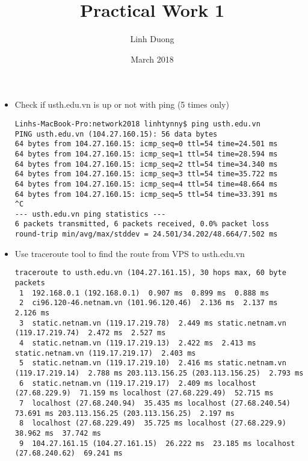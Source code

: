 \documentclass{article}
\title{Practical Work 1}
\author{Linh Duong}
\date{March 2018}
\begin{document}
\maketitle

\bigskip

\begin{itemize}
    \item Check if usth.edu.vn is up or not with ping (5 times only)
    
\begin{verbatim}
Linhs-MacBook-Pro:network2018 linhtynny$ ping usth.edu.vn
PING usth.edu.vn (104.27.160.15): 56 data bytes
64 bytes from 104.27.160.15: icmp_seq=0 ttl=54 time=24.501 ms
64 bytes from 104.27.160.15: icmp_seq=1 ttl=54 time=28.594 ms
64 bytes from 104.27.160.15: icmp_seq=2 ttl=54 time=34.340 ms
64 bytes from 104.27.160.15: icmp_seq=3 ttl=54 time=35.722 ms
64 bytes from 104.27.160.15: icmp_seq=4 ttl=54 time=48.664 ms
64 bytes from 104.27.160.15: icmp_seq=5 ttl=54 time=33.391 ms
^C
--- usth.edu.vn ping statistics ---
6 packets transmitted, 6 packets received, 0.0% packet loss
round-trip min/avg/max/stddev = 24.501/34.202/48.664/7.502 ms
\end{verbatim}

\bigskip


 \item Use traceroute tool to find the route from VPS to usth.edu.vn
 
\begin{verbatim}
traceroute to usth.edu.vn (104.27.161.15), 30 hops max, 60 byte packets
 1  192.168.0.1 (192.168.0.1)  0.907 ms  0.899 ms  0.888 ms
 2  ci96.120-46.netnam.vn (101.96.120.46)  2.136 ms  2.137 ms  2.126 ms
 3  static.netnam.vn (119.17.219.78)  2.449 ms static.netnam.vn (119.17.219.74)  2.472 ms  2.527 ms
 4  static.netnam.vn (119.17.219.13)  2.422 ms  2.413 ms static.netnam.vn (119.17.219.17)  2.403 ms
 5  static.netnam.vn (119.17.219.10)  2.416 ms static.netnam.vn (119.17.219.14)  2.788 ms 203.113.156.25 (203.113.156.25)  2.793 ms
 6  static.netnam.vn (119.17.219.17)  2.409 ms localhost (27.68.229.9)  71.159 ms localhost (27.68.229.49)  52.715 ms
 7  localhost (27.68.240.94)  35.435 ms localhost (27.68.240.54)  73.691 ms 203.113.156.25 (203.113.156.25)  2.197 ms
 8  localhost (27.68.229.49)  35.725 ms localhost (27.68.229.9)  38.962 ms  37.742 ms
 9  104.27.161.15 (104.27.161.15)  26.222 ms  23.185 ms localhost (27.68.240.62)  69.241 ms


\end{verbatim}
\end{itemize}
\end{document}
